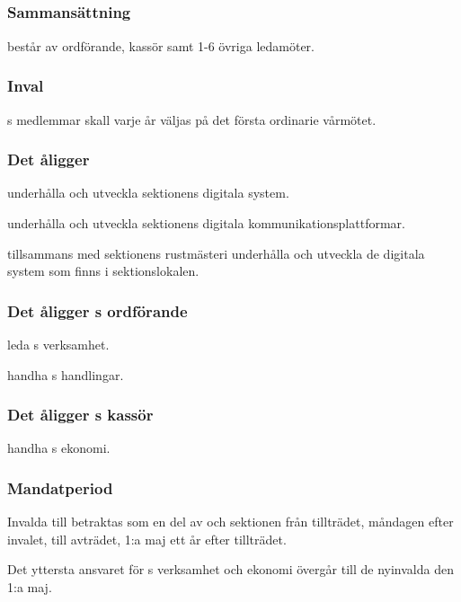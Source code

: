 \subsection{\DIGITFULL}
\subsubsection{Sammansättning}
\DIGIT{} består av ordförande, kassör samt 1-6 övriga ledamöter.

\subsubsection{Inval}
\DIGIT{}s medlemmar skall varje år väljas på det första ordinarie vårmötet.

\subsubsection{Det åligger \DIGIT}
\begin{att}
	\item underhålla och utveckla sektionens digitala system.
	\item underhålla och utveckla sektionens digitala kommunikationsplattformar.
	\item tillsammans med sektionens rustmästeri underhålla och utveckla de digitala system som finns i sektionslokalen.
\end{att}

\subsubsection{Det åligger \DIGIT{}s ordförande}
\begin{att}
	\item leda \DIGIT{}s verksamhet.
	\item handha \DIGIT{}s handlingar.
\end{att}

\subsubsection{Det åligger \DIGIT{}s kassör}
\begin{att}
	\item handha \DIGIT{}s ekonomi.
\end{att}

\subsubsection{Mandatperiod}
Invalda till \DIGIT{} betraktas som en del av \DIGIT{} och sektionen från tillträdet, måndagen efter invalet, till avträdet, 1:a maj ett år efter tillträdet.

Det yttersta ansvaret för \DIGIT{}s verksamhet och ekonomi övergår till de nyinvalda den 1:a maj.


